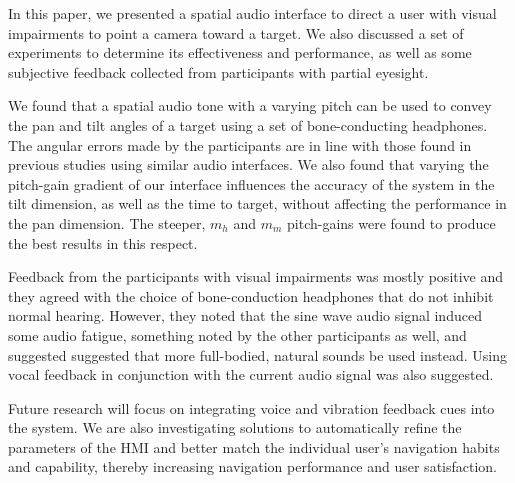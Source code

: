 \documentclass[sigconf, screen=true, anonymous=true]{acmart}
\begin{document}
In this paper, we presented a spatial audio interface to direct a user with visual impairments to point a camera toward a target. We also discussed a set of experiments to determine its effectiveness and performance, as well as some subjective feedback collected from participants with partial eyesight. 

We found that a spatial audio tone with a varying pitch can be used to convey the pan and tilt angles of a target using a set of bone-conducting headphones.
The angular errors made by the participants are in line with those found in previous studies using similar audio interfaces.
We also found that varying the pitch-gain gradient of our interface influences the accuracy of the system in the tilt dimension, as well as the time to target, without affecting the performance in the pan dimension.
The steeper, $m_h$ and $m_m$ pitch-gains were found to produce the best results in this respect.

Feedback from the participants with visual impairments was mostly positive and they agreed with the choice of bone-conduction headphones that do not inhibit normal hearing.
However, they noted that the sine wave audio signal induced some audio fatigue, something noted by the other participants as well, and suggested suggested that more full-bodied, natural sounds be used instead.
Using vocal feedback in conjunction with the current audio signal was also suggested. 

Future research will focus on integrating voice and vibration feedback cues into the system.
We are also investigating solutions to automatically refine the parameters of the HMI and better match the individual user's navigation habits and capability, thereby increasing navigation performance and user satisfaction.


%
\end{document}
